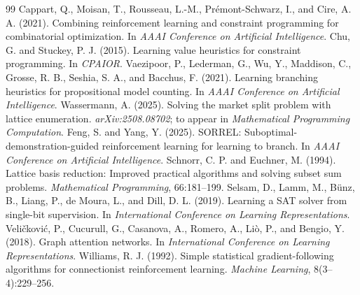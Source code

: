 \documentclass[final,5p,times,twocolumn]{elsarticle}
\begin{document}
\begin{thebibliography}{99}
 Cappart, Q., Moisan, T., Rousseau, L.-M., Pr\'emont-Schwarz, I., and Cire, A. A. (2021). Combining reinforcement learning and constraint programming for combinatorial optimization. In \emph{AAAI Conference on Artificial Intelligence}.
 Chu, G. and Stuckey, P. J. (2015). Learning value heuristics for constraint programming. In \emph{CPAIOR}.
 Vaezipoor, P., Lederman, G., Wu, Y., Maddison, C., Grosse, R. B., Seshia, S. A., and Bacchus, F. (2021). Learning branching heuristics for propositional model counting. In \emph{AAAI Conference on Artificial Intelligence}.
 Wassermann, A. (2025). Solving the market split problem with lattice enumeration. \emph{arXiv:2508.08702}; to appear in \emph{Mathematical Programming Computation}.
 Feng, S. and Yang, Y. (2025). SORREL: Suboptimal-demonstration-guided reinforcement learning for learning to branch. In \emph{AAAI Conference on Artificial Intelligence}.
 Schnorr, C. P. and Euchner, M. (1994). Lattice basis reduction: Improved practical algorithms and solving subset sum problems. \emph{Mathematical Programming}, 66:181--199.
 Selsam, D., Lamm, M., B\"unz, B., Liang, P., de Moura, L., and Dill, D. L. (2019). Learning a SAT solver from single-bit supervision. In \emph{International Conference on Learning Representations}.
 Veli\v{c}kovi\'c, P., Cucurull, G., Casanova, A., Romero, A., Li\`o, P., and Bengio, Y. (2018). Graph attention networks. In \emph{International Conference on Learning Representations}.
 Williams, R. J. (1992). Simple statistical gradient-following algorithms for connectionist reinforcement learning. \emph{Machine Learning}, 8(3--4):229--256.
\end{thebibliography}
\end{document}
